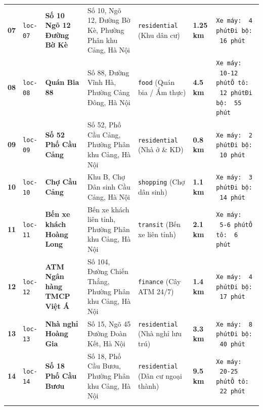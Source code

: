 \documentclass[12pt,a4paper]{article}
\begin{document}
\begin{xltabular}{\textwidth}{C{0.6cm} C{1.1cm} L{2.2cm} L{2.8cm} L{2.0cm} C{1.8cm} >{\raggedright\arraybackslash}X}
\textbf{07} & \texttt{loc-07} & \textbf{Số 10 Ngõ 12 Đường Bờ Kè} & Số 10, Ngõ 12, Đường Bờ Kè, Phường Phân khu Cảng, Hà Nội & \texttt{residential} (Khu dân cư) & \textbf{1.25 km} & \texttt{Xe máy: ~4 phút}\newline \texttt{Đi bộ: ~16 phút} \\ \addlinespace[4pt]
\textbf{08} & \texttt{loc-08} & \textbf{Quán Bia 88} & Số 88, Đường Vĩnh Hà, Phường Cảng Đông, Hà Nội & \texttt{food} (Quán bia / Ẩm thực) & \textbf{4.5 km} & \texttt{Xe máy: ~10-12 phút}\newline \texttt{Ô tô: ~12 phút}\newline \texttt{Đi bộ: ~55 phút} \\ \addlinespace[4pt]
\textbf{09} & \texttt{loc-09} & \textbf{Số 52 Phố Cầu Cảng} & Số 52, Phố Cầu Cảng, Phường Phân khu Cảng, Hà Nội & \texttt{residential} (Nhà ở \& KD) & \textbf{0.8 km} & \texttt{Xe máy: ~2 phút}\newline \texttt{Đi bộ: ~10 phút} \\ \addlinespace[4pt]
\textbf{10} & \texttt{loc-10} & \textbf{Chợ Cầu Cảng} & Khu B, Chợ Dân sinh Cầu Cảng, Hà Nội & \texttt{shopping} (Chợ dân sinh) & \textbf{1.1 km} & \texttt{Xe máy: ~3 phút}\newline \texttt{Đi bộ: ~14 phút} \\ \addlinespace[4pt]
\textbf{11} & \texttt{loc-11} & \textbf{Bến xe khách Hoàng Long} & Bến xe khách liên tỉnh, Phường Phân khu Cảng, Hà Nội & \texttt{transit} (Bến xe liên tỉnh) & \textbf{2.1 km} & \texttt{Xe máy: ~5-6 phút}\newline \texttt{Ô tô: ~6 phút} \\ \addlinespace[4pt]
\textbf{12} & \texttt{loc-12} & \textbf{ATM Ngân hàng TMCP Việt Á} & Số 104, Đường Chiến Thắng, Phường Phân khu Cảng, Hà Nội & \texttt{finance} (Cây ATM 24/7) & \textbf{1.4 km} & \texttt{Xe máy: ~4 phút}\newline \texttt{Đi bộ: ~17 phút} \\ \addlinespace[4pt]
\textbf{13} & \texttt{loc-13} & \textbf{Nhà nghỉ Hoàng Gia} & Số 15, Ngõ 45 Đường Đoàn Kết, Hà Nội & \texttt{residential} (Nhà nghỉ lưu trú) & \textbf{3.3 km} & \texttt{Xe máy: ~8 phút}\newline \texttt{Đi bộ: ~40 phút} \\ \addlinespace[4pt]
\textbf{14} & \texttt{loc-14} & \textbf{Số 18 Phố Cầu Bươu} & Số 18, Phố Cầu Bươu, Phường Phân khu Cảng, Hà Nội & \texttt{residential} (Dân cư ngoại thành) & \textbf{9.5 km} & \texttt{Xe máy: ~20-25 phút}\newline \texttt{Ô tô: ~22 phút} \\ \addlinespace[4pt]

\end{xltabular}
\end{document}
